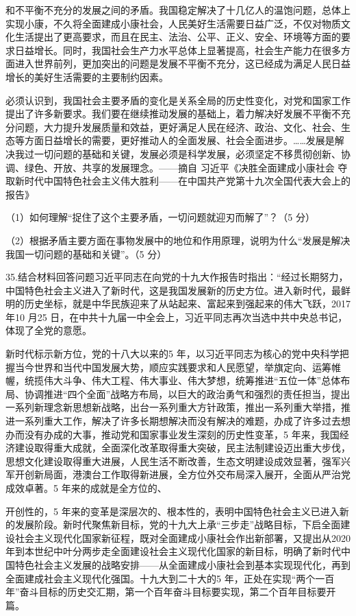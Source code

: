 \documentclass[UTF8,11pt]{ctexart}
\begin{document}
和不平衡不充分的发展之间的矛盾。我国稳定解决了十几亿人的温饱问题，总体上实现小康，不久将全面建成小康社会，人民美好生活需要日益广泛，不仅对物质文化生活提出了更高要求，而且在民主、法治、公平、正义、安全、环境等方面的要求日益增长。同时，我国社会生产力水平总体上显著提高，社会生产能力在很多方面进入世界前列，更加突出的问题是发展不平衡不充分，这已经成为满足人民日益增长的美好生活需要的主要制约因素。

必须认识到，我国社会主要矛盾的变化是关系全局的历史性变化，对党和国家工作提出了许多新要求。我们要在继续推动发展的基础上，着力解决好发展不平衡不充分问题，大力提升发展质量和效益，更好满足人民在经济、政治、文化、社会、生态等方面日益增长的需要，更好推动人的全面发展、社会全面进步。……发展是解决我过一切问题的基础和关键，发展必须是科学发展，必须坚定不移贯彻创新、协调、绿色、开放、共享的发展理念。——摘自 习近平《决胜全面建成小康社会 夺取新时代中国特色社会主义伟大胜利——在中国共产党第十九次全国代表大会上的报告》

（1）如何理解“捉住了这个主要矛盾，一切问题就迎刃而解了”？（5 分）


（2）根据矛盾主要方面在事物发展中的地位和作用原理，说明为什么“发展是解决我国一切问题的基础和关键”。（5 分）


35.结合材料回答问题习近平同志在向党的十九大作报告时指出：“经过长期努力，中国特色社会主义进入了新时代，这是我国发展新的历史方位。进入新时代，最鲜明的历史坐标，就是中华民族迎来了从站起来、富起来到强起来的伟大飞跃，2017 年10 月25 日，在中共十九届一中全会上，习近平同志再次当选中共中央总书记，体现了全党的意愿。

新时代标示新方位，党的十八大以来的5 年，以习近平同志为核心的党中央科学把握当今世界和当代中国发展大势，顺应实践要求和人民愿望，举旗定向、运筹帷幄，统揽伟大斗争、伟大工程、伟大事业、伟大梦想，统筹推进“五位一体”总体布局、协调推进“四个全面”战略方布局，以巨大的政治勇气和强烈的责任担当，提出一系列新理念新思想新战略，出台一系列重大方针政策，推出一系列重大举措，推进一系列重大工作，解决了许多长期想解决而没有解决的难题，办成了许多过去想办而没有办成的大事，推动党和国家事业发生深刻的历史性变革，5 年来，我国经济建设取得重大成就，全面深化改革取得重大突破，民主法制建设迈出重大步伐，思想文化建设取得重大进展，人民生活不断改善，生态文明建设成效显著，强军兴军开创新局面，港澳台工作取得新进展，全方位外交布局深入展开，全面从严治党成效卓著。5 年来的成就是全方位的、

开创性的，5 年来的变革是深层次的、根本性的，表明中国特色社会主义已进入新的发展阶段。新时代聚焦新目标，党的十九大上承“三步走”战略目标，下启全面建设社会主义现代化国家新征程，既对全面建成小康社会作出新部署，又提出从2020 年到本世纪中叶分两步走全面建设社会主义现代化国家的新目标，明确了新时代中国特色社会主义发展的战略安排——从全面建成小康社会到基本实现现代化，再到全面建成社会主义现代化强国。十九大到二十大的5 年，正处在实现“两个一百年”奋斗目标的历史交汇期，第一个百年奋斗目标要实现，第二个百年目标要开篇。
\end{document}
